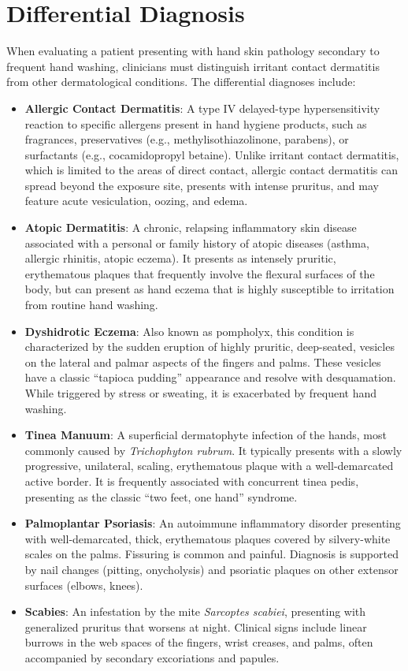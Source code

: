 \section*{Differential Diagnosis}
When evaluating a patient presenting with hand skin pathology secondary to frequent hand washing, clinicians must distinguish irritant contact dermatitis from other dermatological conditions. The differential diagnoses include:
\begin{itemize}
    \item \textbf{Allergic Contact Dermatitis}: A type IV delayed-type hypersensitivity reaction to specific allergens present in hand hygiene products, such as fragrances, preservatives (e.g., methylisothiazolinone, parabens), or surfactants (e.g., cocamidopropyl betaine). Unlike irritant contact dermatitis, which is limited to the areas of direct contact, allergic contact dermatitis can spread beyond the exposure site, presents with intense pruritus, and may feature acute vesiculation, oozing, and edema.
    \item \textbf{Atopic Dermatitis}: A chronic, relapsing inflammatory skin disease associated with a personal or family history of atopic diseases (asthma, allergic rhinitis, atopic eczema). It presents as intensely pruritic, erythematous plaques that frequently involve the flexural surfaces of the body, but can present as hand eczema that is highly susceptible to irritation from routine hand washing.
    \item \textbf{Dyshidrotic Eczema}: Also known as pompholyx, this condition is characterized by the sudden eruption of highly pruritic, deep-seated, vesicles on the lateral and palmar aspects of the fingers and palms. These vesicles have a classic ``tapioca pudding'' appearance and resolve with desquamation. While triggered by stress or sweating, it is exacerbated by frequent hand washing.
    \item \textbf{Tinea Manuum}: A superficial dermatophyte infection of the hands, most commonly caused by \textit{Trichophyton rubrum}. It typically presents with a slowly progressive, unilateral, scaling, erythematous plaque with a well-demarcated active border. It is frequently associated with concurrent tinea pedis, presenting as the classic ``two feet, one hand'' syndrome.
    \item \textbf{Palmoplantar Psoriasis}: An autoimmune inflammatory disorder presenting with well-demarcated, thick, erythematous plaques covered by silvery-white scales on the palms. Fissuring is common and painful. Diagnosis is supported by nail changes (pitting, onycholysis) and psoriatic plaques on other extensor surfaces (elbows, knees).
    \item \textbf{Scabies}: An infestation by the mite \textit{Sarcoptes scabiei}, presenting with generalized pruritus that worsens at night. Clinical signs include linear burrows in the web spaces of the fingers, wrist creases, and palms, often accompanied by secondary excoriations and papules.
\end{itemize}

